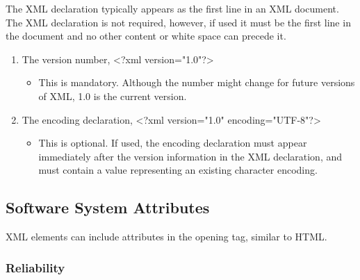 The XML declaration typically appears as the first line in an XML document.
The XML declaration is not required, however, if used it must be the first line in the document and no other content or white space can precede it.
\begin{enumerate}
    \item The version number, <?xml version="1.0"?>
    \begin{itemize}
        \item {
          This is mandatory.
          Although the number might change for future versions of XML, 1.0 is the current version.
        }
    \end{itemize}
    \item The encoding declaration, <?xml version="1.0" encoding="UTF-8"?>
    \begin{itemize}
        \item {
          This is optional.
          If used, the encoding declaration must appear immediately after the version information in the XML declaration, and must contain a value representing an existing character encoding.
        }
    \end{itemize}
\end{enumerate}




\subsection{Software System Attributes}

XML elements can include attributes in the opening tag, similar to HTML.

\subsubsection{Reliability}

